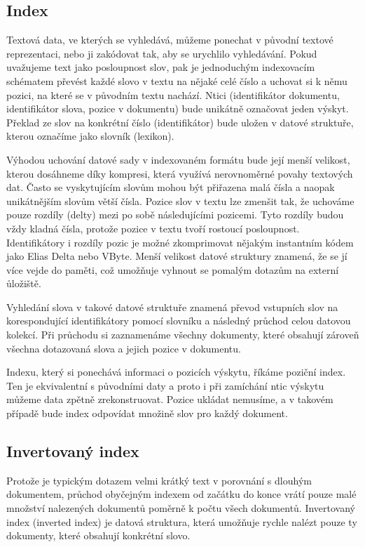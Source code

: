 \documentclass[11pt,letterpaper,oneside,openright]{book}
\begin{document}
\subsection{Index}
Textová data, ve kterých se vyhledává, můžeme ponechat v původní textové
reprezentaci, nebo ji zakódovat tak, aby se urychlilo vyhledávání. Pokud
uvažujeme text jako posloupnost slov, pak je jednoduchým indexovacím schématem
převést každé slovo v textu na nějaké celé číslo a uchovat si k němu pozici, na
které se v původním textu nachází. Ntici (identifikátor dokumentu,
identifikátor slova, pozice v dokumentu) bude unikátně označovat jeden výskyt.
Překlad ze slov na konkrétní číslo (identifikátor) bude uložen v datové
struktuře, kterou označíme jako slovník (lexikon).

Výhodou uchování datové sady v indexovaném formátu bude její menší velikost,
kterou dosáhneme díky kompresi, která využívá nerovnoměrné povahy textových
dat. Často se vyskytujícím slovům mohou být přiřazena malá čísla a naopak
unikátnějším slovům větší čísla. Pozice slov v textu lze zmenšit tak, že
uchováme pouze rozdíly (delty) mezi po sobě následujícími pozicemi. Tyto
rozdíly budou vždy kladná čísla, protože pozice v textu tvoří rostoucí
posloupnost.  Identifikátory i rozdíly pozic je možné zkomprimovat nějakým
instantním kódem jako Elias Delta nebo VByte. Menší velikost datové struktury
znamená, že se jí více vejde do paměti, což umožňuje vyhnout se pomalým dotazům
na externí ůložiště.

Vyhledání slova v takové datové struktuře znamená převod vstupních slov na
korespondující identifikátory pomocí slovníku a následný průchod celou datovou
kolekcí. Při průchodu si zaznamenáme všechny dokumenty, které obsahují zároveň
všechna dotazovaná slova a jejich pozice v dokumentu.

Indexu, který si ponechává informaci o pozicích výskytu, říkáme poziční index.
Ten je ekvivalentní s původními daty a proto i při zamíchání ntic výskytu
můžeme data zpětně zrekonstruovat. Pozice ukládat nemusíme, a v takovém případě
bude index odpovídat množině slov pro každý dokument.


\subsection{Invertovaný index} \label{sec:inverted_index}
Protože je typickým dotazem velmi krátký text v porovnání s dlouhým dokumentem,
průchod obyčejným indexem od začátku do konce vrátí pouze malé množství
nalezených dokumentů poměrně k počtu všech dokumentů. Invertovaný index
(inverted index) je datová struktura, která umožňuje rychle nalézt pouze ty
dokumenty, které obsahují konkrétní slovo.
\end{document}
